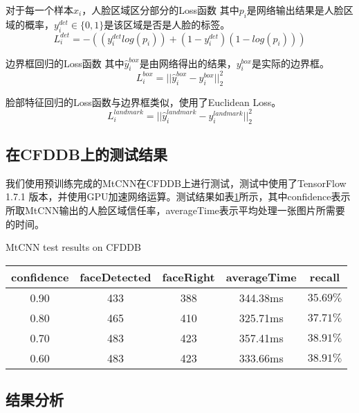 对于每一个样本$x_i$，人脸区域区分部分的Loss函数 其中$p_i$是网络输出结果是人脸区域的概率，$y_i^{det}\in\{0,1\}$是该区域是否是人脸的标签\cite{zhang2016joint}。
\begin{equation}
	L_{i}^{det}=-((y_{i}^{det}log(p_{i}))+(1-y_{i}^{det})(1-log(p_i)))
\end{equation}



边界框回归的Loss函数 其中$\hat{y}_i^{box}$是由网络得出的结果，$y_i^{box}$是实际的边界框\cite{zhang2016joint}。
\begin{equation}
	L_{i}^{box}=||{\hat{y}_i^{box}-y_i^{box}}||_2^2
\end{equation}



脸部特征回归的Loss函数与边界框类似，使用了Euclidean Loss\cite{zhang2016joint}。
\begin{equation}
L_{i}^{landmark}=||{\hat{y}_i^{landmark}-y_i^{landmark}}||_2^2
\end{equation}



\subsection{在CFDDB上的测试结果}

我们使用预训练完成的MtCNN在CFDDB上进行测试，测试中使用了TensorFlow 1.7.1 版本，并使用GPU加速网络运算。测试结果如表\ref{tab:mtcnn}所示，其中confidence表示所取MtCNN输出的人脸区域信任率，averageTime表示平均处理一张图片所需要的时间。

\begin{table}[!hpb]
	\centering
	{MtCNN test results on CFDDB}
	\label{tab:mtcnn}
	\begin{tabular}{ cccc | c }
		\hline
		confidence & faceDetected & faceRight & averageTime & recall\\
		\hline
		0.90 & 433 & 388 & 344.38ms & $35.69\%$\\
		0.80 & 465 & 410 & 325.71ms & $37.71\%$\\
		0.70 & 483 & 423 & 357.41ms & $38.91\%$\\
		0.60 & 483 & 423 & 333.66ms & $38.91\%$\\
		\hline
	\end{tabular}
\end{table}

\subsection{结果分析}

